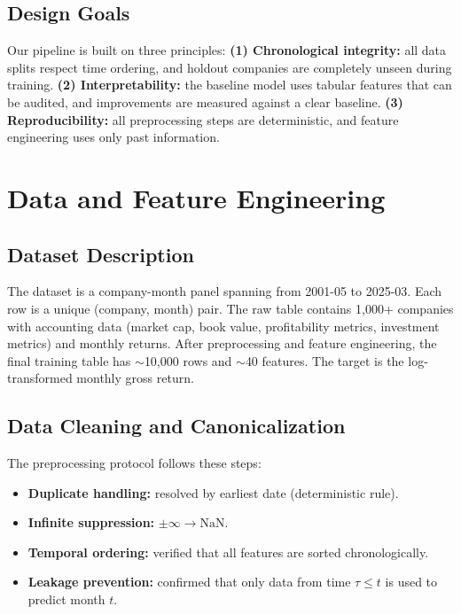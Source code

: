 \documentclass[11pt]{article}
\begin{document}
\subsection{Design Goals}
Our pipeline is built on three principles: \textbf{(1) Chronological integrity:} all data splits respect time ordering, and holdout companies are completely unseen during training. \textbf{(2) Interpretability:} the baseline model uses tabular features that can be audited, and improvements are measured against a clear baseline. \textbf{(3) Reproducibility:} all preprocessing steps are deterministic, and feature engineering uses only past information.

\section{Data and Feature Engineering}

\subsection{Dataset Description}
The dataset is a company-month panel spanning from 2001-05 to 2025-03. Each row is a unique (company, month) pair. The raw table contains 1,000+ companies with accounting data (market cap, book value, profitability metrics, investment metrics) and monthly returns. After preprocessing and feature engineering, the final training table has $\sim$10,000 rows and $\sim$40 features. The target is the log-transformed monthly gross return.

\subsection{Data Cleaning and Canonicalization}
The preprocessing protocol follows these steps:
\begin{itemize}[leftmargin=1.2em]
    \item \textbf{Duplicate handling:} resolved by earliest date (deterministic rule).
    \item \textbf{Infinite suppression:} $\pm \infty \to \mathrm{NaN}$.
    \item \textbf{Temporal ordering:} verified that all features are sorted chronologically.
    \item \textbf{Leakage prevention:} confirmed that only data from time $\tau \le t$ is used to predict month $t$.
\end{itemize}
\end{document}
